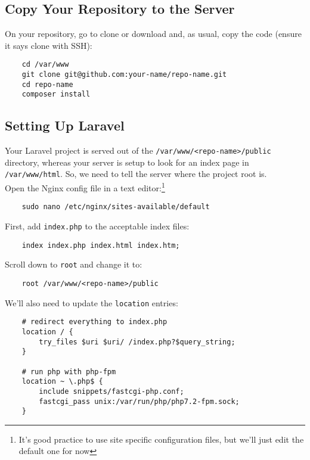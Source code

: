 \subsection{Copy Your Repository to the Server}

On your repository, go to clone or download and, as usual, copy the code (ensure it says clone with SSH):

\begin{verbatim}
    cd /var/www
    git clone git@github.com:your-name/repo-name.git
    cd repo-name
    composer install
\end{verbatim}



\subsection{Setting Up Laravel}

Your Laravel project is served out of the \texttt{/var/www/<repo-name>/public} directory, whereas your server is setup to look for an index page in \texttt{/var/www/html}. So, we need to tell the server where the project root is.
\\

Open the Nginx config file in a text editor:\footnote{It's good practice to use site specific configuration files, but we'll just edit the default one for now}

\begin{verbatim}
    sudo nano /etc/nginx/sites-available/default
\end{verbatim}

First, add \texttt{index.php} to the acceptable index files:

\begin{verbatim}
    index index.php index.html index.htm;
\end{verbatim}

Scroll down to \texttt{root} and change it to:

\begin{verbatim}
    root /var/www/<repo-name>/public
\end{verbatim}

We'll also need to update the \texttt{location} entries:

\begin{verbatim}
    # redirect everything to index.php
    location / {
        try_files $uri $uri/ /index.php?$query_string;
    }

    # run php with php-fpm
    location ~ \.php$ {
        include snippets/fastcgi-php.conf;
        fastcgi_pass unix:/var/run/php/php7.2-fpm.sock;
    }
\end{verbatim}


